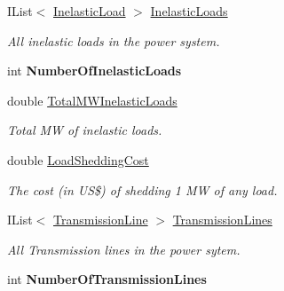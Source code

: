 \begin{DoxyCompactItemize}
\item 
I\+List$<$ \hyperlink{class_power_system_planning_1_1_inelastic_load}{Inelastic\+Load} $>$ \hyperlink{class_power_system_planning_1_1_power_system_a3785895f5e1d62105769d59f433979b1}{Inelastic\+Loads}
\begin{DoxyCompactList}\small\item\em All inelastic loads in the power system. \end{DoxyCompactList}\item 
int {\bfseries Number\+Of\+Inelastic\+Loads}\hypertarget{class_power_system_planning_1_1_power_system_a923796a156c2438a8a95bc34308732bc}{}\label{class_power_system_planning_1_1_power_system_a923796a156c2438a8a95bc34308732bc}

\item 
double \hyperlink{class_power_system_planning_1_1_power_system_ade5099d2eb198a61bf794e14ce4b3018}{Total\+M\+W\+Inelastic\+Loads}
\begin{DoxyCompactList}\small\item\em Total MW of inelastic loads. \end{DoxyCompactList}\item 
double \hyperlink{class_power_system_planning_1_1_power_system_a3f0729d4eaa155e4b8be848d84a1fbff}{Load\+Shedding\+Cost}
\begin{DoxyCompactList}\small\item\em The cost (in US\$) of shedding 1 MW of any load. \end{DoxyCompactList}\item 
I\+List$<$ \hyperlink{class_power_system_planning_1_1_transmission_line}{Transmission\+Line} $>$ \hyperlink{class_power_system_planning_1_1_power_system_a8b2c36218174e515b9ab0ef34531435f}{Transmission\+Lines}
\begin{DoxyCompactList}\small\item\em All Transmission lines in the power sytem. \end{DoxyCompactList}\item 
int {\bfseries Number\+Of\+Transmission\+Lines}\hypertarget{class_power_system_planning_1_1_power_system_aec138fa5496014f03d2511d62f19ce1f}{}\label{class_power_system_planning_1_1_power_system_aec138fa5496014f03d2511d62f19ce1f}

\end{DoxyCompactItemize}


